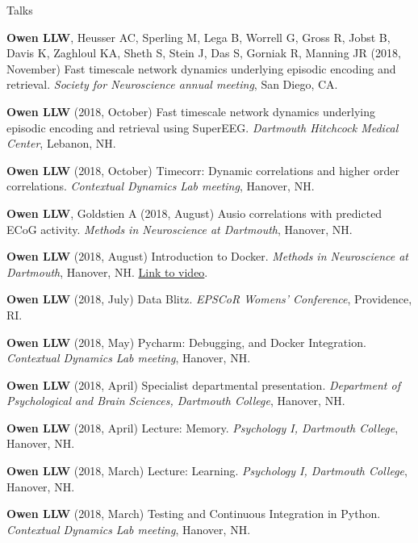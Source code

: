 \documentclass{resume} %
\begin{document}
\begin{rSection}{Talks} \itemsep -2pt

\item \textbf{Owen LLW}, Heusser AC, Sperling M, Lega B, Worrell G, Gross R, Jobst B, Davis K, Zaghloul KA, Sheth S, Stein J, Das S, Gorniak R, Manning JR (2018, November) Fast timescale network dynamics underlying episodic encoding and retrieval. \textit{Society for Neuroscience annual meeting}, San Diego, CA.

\item \textbf{Owen LLW} (2018, October) Fast timescale network dynamics underlying episodic encoding and retrieval using SuperEEG. \textit{Dartmouth Hitchcock Medical Center}, Lebanon, NH.

\item \textbf{Owen LLW} (2018, October) Timecorr: Dynamic correlations and higher order correlations.
\textit{Contextual Dynamics Lab meeting}, Hanover, NH. 

\item \textbf{Owen LLW}, Goldstien A (2018, August) Ausio correlations with predicted ECoG activity. \textit{Methods in Neuroscience at Dartmouth}, Hanover, NH.

\item \textbf{Owen LLW} (2018, August) Introduction to Docker. \textit{Methods in Neuroscience at Dartmouth}, Hanover, NH. \href{https://www.youtube.com/watch?v=hUvYdXo5MfU}{Link to video}.

\item \textbf{Owen LLW} (2018, July) Data Blitz.
\textit{EPSCoR Womens' Conference}, Providence, RI. 

\item \textbf{Owen LLW} (2018, May) Pycharm: Debugging, and Docker Integration.
\textit{Contextual Dynamics Lab meeting}, Hanover, NH.

\item \textbf{Owen LLW} (2018, April) Specialist departmental presentation. \textit{Department of Psychological and Brain Sciences, Dartmouth College}, Hanover, NH.

\item \textbf{Owen LLW} (2018, April) Lecture: Memory. \textit{Psychology I, Dartmouth College}, Hanover, NH.

\item \textbf{Owen LLW} (2018, March) Lecture: Learning. \textit{Psychology I, Dartmouth College}, Hanover, NH.

\item \textbf{Owen LLW} (2018, March) Testing and Continuous Integration in Python.
\textit{Contextual Dynamics Lab meeting}, Hanover, NH.


\end{rSection}
\end{document}
